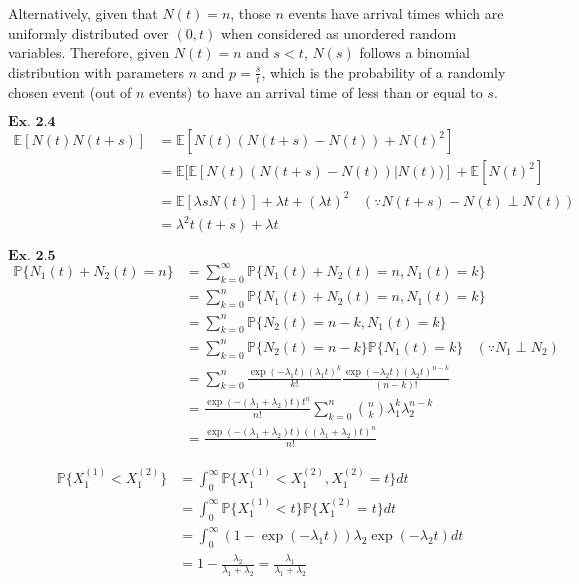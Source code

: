 \documentclass{article}
\begin{document}
Alternatively, given that $N(t) = n$, those $n$ events have arrival times which are uniformly distributed over $(0,t)$ when considered as unordered random variables. Therefore, given $N(t) = n$ and $s<t$, $N(s)$ follows a binomial distribution with parameters $n$ and $p = \frac{s}{t}$, which is the probability of a randomly chosen event (out of $n$ events) to have an arrival time of less than or equal to $s$.

\vspace{0.2in}
${\textbf{Ex. 2.4}}$
\begin{align*}
\mathbb{E}[N(t)N(t+s)] &= \mathbb{E}[N(t)(N(t+s)-N(t)) + N(t)^{2}]\\
&= \mathbb{E}[\mathbb{E}[N(t)(N(t+s)-N(t))|N(t))]+\mathbb{E}[N(t)^2]\\
&= \mathbb{E}[\lambda sN(t)] + \lambda t + (\lambda t)^2 \ \ \ \ (\because N(t+s)-N(t) \perp N(t))\\
&= \lambda^2t (t+s) + \lambda t
\end{align*}


\vspace{0.2in}
${\textbf{Ex. 2.5}}$
\begin{align*}
\mathbb{P}\{N_1(t)+N_2(t) = n\} &= \sum_{k=0}^{\infty}\mathbb{P}\{N_1(t)+N_2(t)=n, N_1(t) = k\}\\
&= \sum_{k=0}^{n}\mathbb{P}\{N_1(t)+N_2(t)=n, N_1(t) = k\}\\
&= \sum_{k=0}^{n}\mathbb{P}\{N_2(t)=n-k, N_1(t) = k\}\\
&= \sum_{k=0}^{n}\mathbb{P}\{N_2(t)=n-k\}\mathbb{P}\{N_1(t) = k\} \ \ \ \ (\because N_1 \perp N_2)\\
&= \sum_{k=0}^{n}\frac{\exp(-\lambda_1t)(\lambda_1 t)^{k}}{k!}\frac{\exp(-\lambda_2t)(\lambda_2t)^{n-k}}{(n-k)!}\\
&= \frac{\exp(-(\lambda_1+\lambda_2)t)t^n}{n!}\sum_{k=0}^{n}\binom{n}{k}\lambda_1^k\lambda_2^{n-k}\\
&= \frac{\exp(-(\lambda_1+\lambda_2)t)((\lambda_1 + \lambda_2)t)^n}{n!}
\end{align*}

\begin{align*}
\mathbb{P}\{X^{(1)}_1 < X^{(2)}_1\} &= \int_{0}^{\infty}\mathbb{P}\{X^{(1)}_1 < X^{(2)}_1,X^{(2)}_1=t\}dt\\
&= \int_{0}^{\infty}\mathbb{P}\{X^{(1)}_1 < t\}\mathbb{P}\{X^{(2)}_1=t\}dt\\
&= \int_{0}^{\infty}(1-\exp(-\lambda_1 t))\lambda_2 \exp(-\lambda_2 t)dt\\
&= 1- \frac{\lambda_2}{\lambda_1 + \lambda_2} = \frac{\lambda_1}{\lambda_1 + \lambda_2}
\end{align*}
\end{document}

